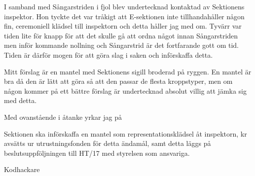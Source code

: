 \documentclass[./vt16.tex]{subfiles}
\begin{document}

I samband med Sångarstriden i fjol blev undertecknad kontaktad av Sektionens inspektor. Hon tyckte det var tråkigt att E-sektionen inte tillhandahåller någon fin, ceremoniell klädsel till inspektorn och detta håller jag med om. Tyvärr var tiden lite för knapp för att det skulle gå att ordna något innan Sångarstriden men inför kommande nollning och Sångarstrid är det fortfarande gott om tid. Tiden är därför mogen för att göra slag i saken och införskaffa detta. 

Mitt förslag är en mantel med Sektionens sigill broderad på ryggen. En mantel är bra då den är lätt att göra så att den passar de flesta kroppstyper, men om någon kommer på ett bättre förslag är undertecknad absolut villig att jämka sig med detta.

Med ovanstående i åtanke yrkar jag på
\begin{attsatser}
    \att Sektionen ska införskaffa en mantel som representationsklädsel åt inspektorn,
     kr avsätts ur utrustningsfonden för detta ändamål, samt
    \att detta läggs på beslutsuppföljningen till HT/17 med styrelsen som ansvariga.
\end{attsatser}

\begin{signatures}{1}
    \mvh
    \signature{Fredrik Peterson}{Kodhackare}
\end{signatures}
\end{document}
